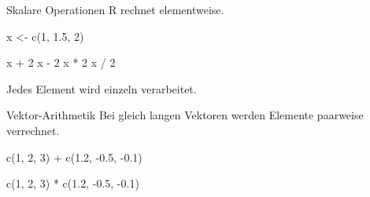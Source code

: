 \documentclass[
  10pt,
  ignorenonframetext,
  aspectratio=169,
]{beamer}
\newenvironment{Shaded}{}{}
\newcommand{\DecValTok}[1]{\textcolor[rgb]{0.25,0.63,0.44}{#1}}
\newcommand{\FloatTok}[1]{\textcolor[rgb]{0.25,0.63,0.44}{#1}}
\newcommand{\FunctionTok}[1]{\textcolor[rgb]{0.02,0.16,0.49}{#1}}
\newcommand{\NormalTok}[1]{#1}
\newcommand{\OtherTok}[1]{\textcolor[rgb]{0.00,0.44,0.13}{#1}}
\newcommand{\SpecialCharTok}[1]{\textcolor[rgb]{0.25,0.44,0.63}{#1}}
\begin{document}
\begin{frame}[fragile]{Skalare Operationen}
\label{skalare-operationen}
R rechnet elementweise.

\begin{Shaded}
\begin{Highlighting}[]
\NormalTok{x }\OtherTok{\textless{}{-}} \FunctionTok{c}\NormalTok{(}\DecValTok{1}\NormalTok{, }\FloatTok{1.5}\NormalTok{, }\DecValTok{2}\NormalTok{)}

\NormalTok{x }\SpecialCharTok{+} \DecValTok{2}
\NormalTok{x }\SpecialCharTok{{-}} \DecValTok{2}
\NormalTok{x }\SpecialCharTok{*} \DecValTok{2}
\NormalTok{x }\SpecialCharTok{/} \DecValTok{2}
\end{Highlighting}
\end{Shaded}

Jedes Element wird einzeln verarbeitet.
\end{frame}

\begin{frame}[fragile]{Vektor-Arithmetik}
\label{vektor-arithmetik}
Bei gleich langen Vektoren werden Elemente paarweise verrechnet.

\begin{Shaded}
\begin{Highlighting}[]
\FunctionTok{c}\NormalTok{(}\DecValTok{1}\NormalTok{, }\DecValTok{2}\NormalTok{, }\DecValTok{3}\NormalTok{) }\SpecialCharTok{+} \FunctionTok{c}\NormalTok{(}\FloatTok{1.2}\NormalTok{, }\SpecialCharTok{{-}}\FloatTok{0.5}\NormalTok{, }\SpecialCharTok{{-}}\FloatTok{0.1}\NormalTok{)}

\FunctionTok{c}\NormalTok{(}\DecValTok{1}\NormalTok{, }\DecValTok{2}\NormalTok{, }\DecValTok{3}\NormalTok{) }\SpecialCharTok{*} \FunctionTok{c}\NormalTok{(}\FloatTok{1.2}\NormalTok{, }\SpecialCharTok{{-}}\FloatTok{0.5}\NormalTok{, }\SpecialCharTok{{-}}\FloatTok{0.1}\NormalTok{)}
\end{Highlighting}
\end{Shaded}
\end{frame}
\end{document}
